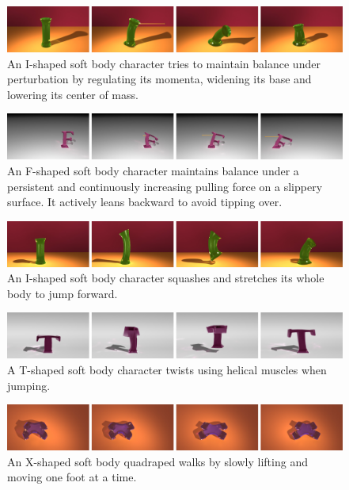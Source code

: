 \begin{figure}[ht]
\centering
\includegraphics[width=\textwidth]{figures/IBalance.eps}
\caption{An I-shaped soft body character tries to maintain balance under
perturbation by regulating its momenta, widening its base and lowering its center of mass.}
\label{fig:IBalance}
\end{figure}

\begin{figure}[ht]
\centering
\includegraphics[width=\textwidth]{figures/FBalance.eps}
\caption{An F-shaped soft body character maintains balance under a persistent and continuously increasing pulling force on a slippery surface. It actively leans backward to avoid tipping over.}
\label{fig:FBalance}
\end{figure}

\begin{figure}[ht]
\centering
\includegraphics[width=\textwidth]{figures/IJump.eps}
\caption{An I-shaped soft body character squashes and stretches its whole body to jump forward.}
\label{fig:IJump}
\end{figure}

\begin{figure}[ht]
\centering
\includegraphics[width=\textwidth]{figures/TTwist.eps}
\caption{A T-shaped soft body character twists using helical muscles when jumping.}
\label{fig:TJump}
\end{figure}

\begin{figure}[ht]
\centering
\includegraphics[width=\textwidth]{figures/XWalk.eps}
\caption{An X-shaped soft body quadraped walks by slowly lifting and moving one foot at a time.}
\label{fig:XWalk}
\end{figure}

